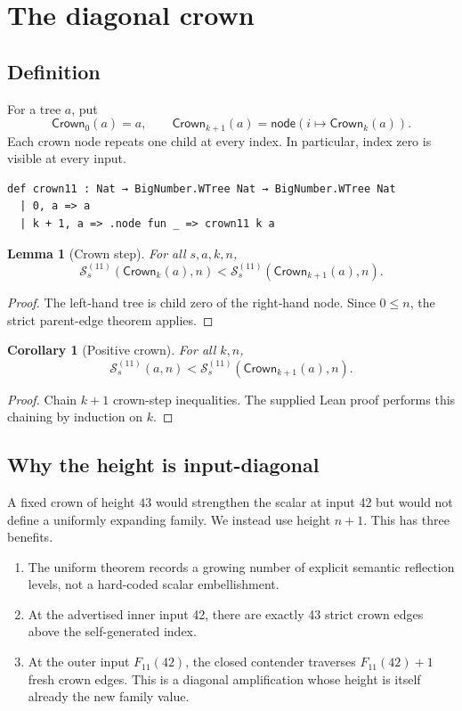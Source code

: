 \documentclass[11pt]{article}
\newtheorem{lemma}[theorem]{Lemma}
\newtheorem{corollary}[theorem]{Corollary}
\theoremstyle{definition}
\theoremstyle{remark}
\newcommand{\Sstage}{\mathcal{S}^{(11)}}
\newcommand{\Crown}{\mathsf{Crown}}
\newcommand{\Feleven}{F_{11}}
\begin{document}
\section{The diagonal crown}

\subsection{Definition}

For a tree $a$, put
\[
  \Crown_0(a)=a,\qquad
  \Crown_{k+1}(a)=\mathsf{node}(i\mapsto\Crown_k(a)).
\]
Each crown node repeats one child at every index.  In particular, index zero is
visible at every input.

\begin{lstlisting}
def crown11 : Nat → BigNumber.WTree Nat → BigNumber.WTree Nat
  | 0, a => a
  | k + 1, a => .node fun _ => crown11 k a
\end{lstlisting}

\begin{lemma}[Crown step]
For all $s,a,k,n$,
\[
  \Sstage_s(\Crown_k(a),n)
  <\Sstage_s(\Crown_{k+1}(a),n).
\]
\end{lemma}
\begin{proof}
The left-hand tree is child zero of the right-hand node.  Since $0\le n$, the
strict parent-edge theorem applies.
\end{proof}

\begin{corollary}[Positive crown]
For all $k,n$,
\[
  \Sstage_s(a,n)<\Sstage_s(\Crown_{k+1}(a),n).
\]
\end{corollary}
\begin{proof}
Chain $k+1$ crown-step inequalities.  The supplied Lean proof performs this
chaining by induction on $k$.
\end{proof}

\subsection{Why the height is input-diagonal}

A fixed crown of height $43$ would strengthen the scalar at input 42 but would
not define a uniformly expanding family.  We instead use height $n+1$.  This
has three benefits.

\begin{enumerate}
\item The uniform theorem records a growing number of explicit semantic
reflection levels, not a hard-coded scalar embellishment.
\item At the advertised inner input 42, there are exactly 43 strict crown
edges above the self-generated index.
\item At the outer input $\Feleven(42)$, the closed contender traverses
$\Feleven(42)+1$ fresh crown edges.  This is a diagonal amplification whose
height is itself already the new family value.
\end{enumerate}
\end{document}
